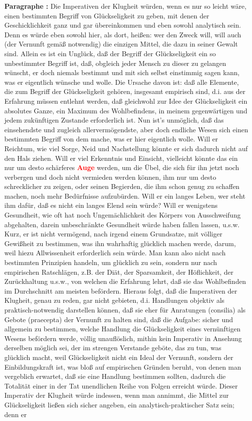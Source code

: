 \documentclass[a4paper,12pt,twoside]{book}
\newcommand{\match}[1]{\textcolor{red}{\textbf{#1}}}
\begin{document}
	\noindent\textbf{Paragraphe : }Die Imperativen der Klugheit würden, wenn es nur so leicht wäre, einen bestimmten Begriff von Glückseligkeit zu geben, mit denen der Geschicklichkeit ganz und gar übereinkommen und eben sowohl analytisch sein. Denn es würde eben sowohl hier, als dort, heißen: wer den Zweck will, will auch (der Vernunft gemäß notwendig) die einzigen Mittel, die dazu in seiner Gewalt sind. Allein es ist ein Unglück, daß der Begriff der Glückseligkeit ein so unbestimmter Begriff ist, daß, obgleich jeder Mensch zu dieser zu gelangen wünscht, er doch niemals bestimmt und mit sich selbst einstimmig sagen kann, was er eigentlich wünsche und wolle. Die Ursache davon ist: daß alle Elemente, die zum Begriff der Glückseligkeit gehören, insgesamt empirisch sind, d.i. aus der Erfahrung müssen entlehnt werden, daß gleichwohl zur Idee der Glückseligkeit ein absolutes Ganze, ein Maximum des Wohlbefindens, in meinem gegenwärtigen und jedem zukünftigen Zustande erforderlich ist. Nun ist's unmöglich, daß das einsehendste und zugleich allervermögendste, aber doch endliche Wesen sich einen bestimmten Begriff von dem mache, was er hier eigentlich wolle. Will er Reichtum, wie viel Sorge, Neid und Nachstellung könnte er sich dadurch nicht auf den Hals ziehen. Will er viel Erkenntnis und Einsicht, vielleicht könnte das ein nur um desto schärferes \match{Auge} werden, um die Übel, die sich für ihn jetzt noch verbergen und doch nicht vermieden werden können, ihm nur  um desto schrecklicher zu zeigen, oder seinen Begierden, die ihm schon genug zu schaffen machen, noch mehr Bedürfnisse aufzubürden. Will er ein langes Leben, wer steht ihm dafür, daß es nicht ein langes Elend sein würde? Will er wenigstens Gesundheit, wie oft hat noch Ungemächlichkeit des Körpers von Ausschweifung abgehalten, darein unbeschränkte Gesundheit würde haben fallen lassen, u.s.w. Kurz, er ist nicht vermögend, nach irgend einem Grundsatze, mit völliger Gewißheit zu bestimmen, was ihn wahrhaftig glücklich machen werde, darum, weil hiezu Allwissenheit erforderlich sein würde. Man kann also nicht nach bestimmten Prinzipien handeln, um glücklich zu sein, sondern nur nach empirischen Ratschlägen, z.B. der Diät, der Sparsamkeit, der Höflichkeit, der Zurückhaltung u.s.w., von welchen die Erfahrung lehrt, daß sie das Wohlbefinden im Durchschnitt am meisten befördern. Hieraus folgt, daß die Imperativen der Klugheit, genau zu reden, gar nicht gebieten, d.i. Handlungen objektiv als praktisch-notwendig darstellen können, daß sie eher für Anratungen (consilia) als Gebote (praecepta) der Vernunft zu halten sind, daß die Aufgabe: sicher und allgemein zu bestimmen, welche Handlung die Glückseligkeit eines vernünftigen Wesens befördern werde, völlig unauflöslich, mithin kein Imperativ in Ansehung derselben möglich sei, der im strengen Verstande geböte, das zu tun, was glücklich macht, weil Glückseligkeit nicht ein Ideal der Vernunft, sondern der Einbildungskraft ist, was bloß auf empirischen Gründen beruht, von denen man vergeblich erwartet, daß sie eine Handlung bestimmen sollten, dadurch die Totalität einer in der Tat unendlichen Reihe von Folgen erreicht würde. Dieser Imperativ der Klugheit würde indessen, wenn man annimmt, die Mittel zur Glückseligkeit ließen sich sicher angeben, ein analytisch-praktischer Satz sein; denn er 
\end{document}
